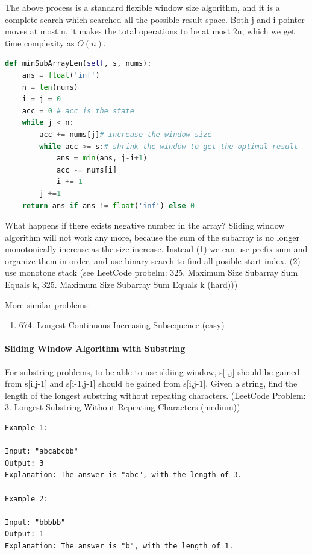 \documentclass[../searching.tex]{subfiles}
\begin{document}
The above process is a standard flexible window size algorithm, and it is a complete search which searched all the possible result space. Both j and i pointer moves at most n, it makes the total operations to be at most 2n, which we get time complexity as $O(n)$. 
\begin{lstlisting}[language=Python]
def minSubArrayLen(self, s, nums):
    ans = float('inf')
    n = len(nums)
    i = j = 0
    acc = 0 # acc is the state
    while j < n:
        acc += nums[j]# increase the window size
        while acc >= s:# shrink the window to get the optimal result
            ans = min(ans, j-i+1)
            acc -= nums[i]
            i += 1
        j +=1
    return ans if ans != float('inf') else 0
\end{lstlisting}
\begin{bclogo}[couleur = blue!30, arrondi=0.1,logo=\bccrayon,ombre=true]{What happens if there exists negative number in the array? } Sliding window algorithm will not work any more, because the sum of the subarray is no longer monotonically increase as the size increase. Instead (1) we can use prefix sum and organize them in order, and use binary search to find all posible start index.  (2) use monotone stack (see  LeetCode probelm: 325. Maximum Size Subarray Sum Equals k, 325. Maximum Size Subarray Sum Equals k (hard)))
\end{bclogo}

More similar problems:
\begin{enumerate}
    \item 674. Longest Continuous Increasing Subsequence (easy)
\end{enumerate}

\paragraph{Sliding Window Algorithm with Substring} For substring problems, to be able to use sldiing window, s[i,j] should be gained from s[i,j-1] and s[i-1,j-1] should be gained from s[i,j-1]. Given a string, find the length of the longest substring without repeating characters. (LeetCode Problem: 3. Longest Substring Without Repeating Characters (medium))
\begin{lstlisting}[numbers=none]
Example 1:

Input: "abcabcbb"
Output: 3 
Explanation: The answer is "abc", with the length of 3. 

Example 2:

Input: "bbbbb"
Output: 1
Explanation: The answer is "b", with the length of 1.
\end{lstlisting}
\end{document}
